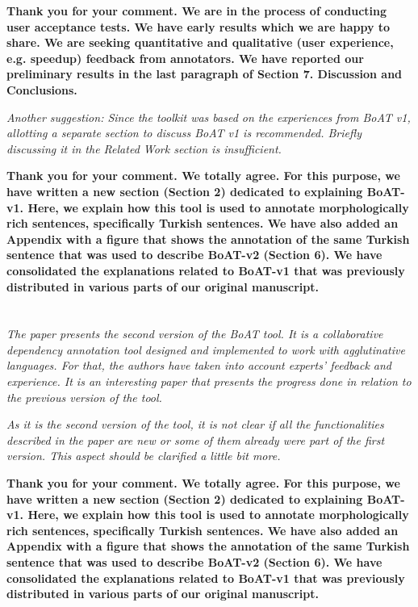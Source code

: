\documentclass[final,2p]{article}
\newcommand{\comment}{\emph}
\newcommand{\response}{\noindent \textbf}
\begin{document}
\response{Thank you for your comment. We are in the process of conducting user acceptance tests. We have early results which we are happy to share. We are seeking quantitative and qualitative (user experience, e.g. speedup) feedback from annotators. We have reported our preliminary results in the last paragraph of Section 7. Discussion and Conclusions.}

\comment{Another suggestion: Since the toolkit was based on the experiences from BoAT v1, allotting a separate section to discuss BoAT v1 is recommended. Briefly discussing it in the Related Work section is insufficient.}

\response{Thank you for your comment. We totally agree. For this purpose, we have written a new section (Section 2) dedicated to explaining BoAT-v1. Here, we explain how this tool is used to annotate morphologically rich sentences, specifically Turkish sentences. We have also added an Appendix with a figure that shows the annotation of the same Turkish sentence that was used to describe BoAT-v2 (Section 6). We have consolidated the explanations related to BoAT-v1 that was previously distributed in various parts of our original manuscript.}

\section*{}

\comment{The paper presents the second version of the BoAT tool. It is a collaborative dependency annotation tool designed and implemented to work with agglutinative languages. For that, the authors have taken into account experts' feedback and experience. It is an interesting paper that presents the progress done in relation to the previous version of the tool.}

\comment{As it is the second version of the tool, it is not clear if all the functionalities described in the paper are new or some of them already were part of the first version. This aspect should be clarified a little bit more.}

\response{Thank you for your comment. We totally agree. For this purpose, we have written a new section (Section 2) dedicated to explaining BoAT-v1. Here, we explain how this tool is used to annotate morphologically rich sentences, specifically Turkish sentences. We have also added an Appendix with a figure that shows the annotation of the same Turkish sentence that was used to describe BoAT-v2 (Section 6). We have consolidated the explanations related to BoAT-v1 that was previously distributed in various parts of our original manuscript.}
\end{document}

